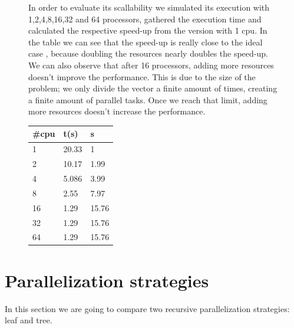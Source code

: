 \documentclass{article}
\begin{document}
\begin{figure}[!h]
\centering
\begin{minipage}[t]{.62\textwidth}
\centering
\vspace{0pt}
\justify
In order to evaluate its scallability we simulated its execution with 1,2,4,8,16,32 and 64 processors, gathered the execution time and calculated the respective speed-up from the version with 1 cpu.
\justify
In the table we can see that the speed-up is really close to the ideal case , because doubling the resources nearly doubles the speed-up. We can also observe that after 16 processors, adding more resources doesn't improve the performance. This is due to the size of the problem; we only divide the vector a finite amount of times, creating a finite amount of parallel tasks. Once we reach that limit, adding more resources doesn't increase the performance.
\end{minipage}\hfill
\begin{minipage}[t]{.35\textwidth}
\centering
\vspace{0pt}
\begin{tabular}{|l||l|l|}
\hline
\#cpu & t(s)  & s     \\ \hline
1     & 20.33 & 1     \\ \hline
2     & 10.17 & 1.99  \\ \hline
4     & 5.086 & 3.99  \\ \hline
8     & 2.55  & 7.97  \\ \hline
16    & 1.29  & 15.76 \\ \hline
32    & 1.29  & 15.76 \\ \hline
64    & 1.29  & 15.76 \\ \hline
\end{tabular}
\end{minipage}
\end{figure}


\clearpage
\section{Parallelization strategies}
\justify
In this section we are going to compare two recursive parallelization strategies: leaf and tree. 
\end{document}
